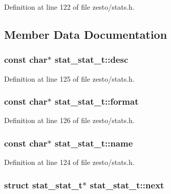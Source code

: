 Definition at line 122 of file zesto/stats.h.

\subsection{Member Data Documentation}
\subsubsection[{desc}]{\setlength{\rightskip}{0pt plus 5cm}const char$\ast$ {\bf stat\_\-stat\_\-t::desc}}\label{structstat__stat__t_bd10a35fb99e5a028095882d37ca2309}




Definition at line 125 of file zesto/stats.h.
\subsubsection[{format}]{\setlength{\rightskip}{0pt plus 5cm}const char$\ast$ {\bf stat\_\-stat\_\-t::format}}\label{structstat__stat__t_cb226be68234f23178a842e1a4acf8cd}




Definition at line 126 of file zesto/stats.h.
\subsubsection[{name}]{\setlength{\rightskip}{0pt plus 5cm}const char$\ast$ {\bf stat\_\-stat\_\-t::name}}\label{structstat__stat__t_68865d7221abe93b4b3c331e192f0d38}




Definition at line 124 of file zesto/stats.h.
\subsubsection[{next}]{\setlength{\rightskip}{0pt plus 5cm}struct {\bf stat\_\-stat\_\-t}$\ast$ {\bf stat\_\-stat\_\-t::next}\hspace{0.3cm}{\tt  [read]}}\label{structstat__stat__t_96bb6646d86da1836eff66d9e4969cb7}





